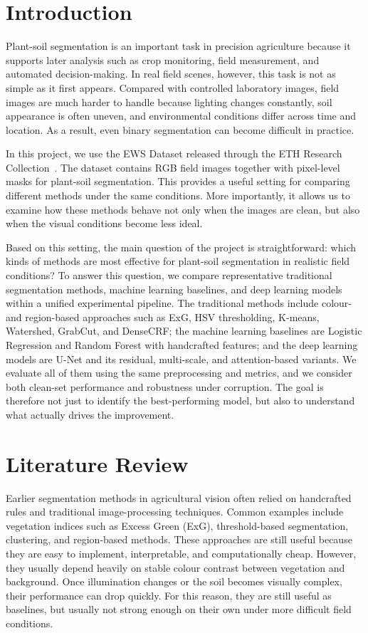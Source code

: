 \documentclass[conference]{IEEEtran}
\begin{document}
\section{Introduction}

Plant-soil segmentation is an important task in precision agriculture
because it supports later analysis such as crop monitoring, field
measurement, and automated decision-making. In real field scenes,
however, this task is not as simple as it first appears. Compared with
controlled laboratory images, field images are much harder to handle
because lighting changes constantly, soil appearance is often uneven,
and environmental conditions differ across time and location. As a
result, even binary segmentation can become difficult in practice.

In this project, we use the EWS Dataset released through the ETH
Research Collection~\cite{ews}. The dataset contains RGB field images
together with pixel-level masks for plant-soil segmentation. This
provides a useful setting for comparing different methods under the same
conditions. More importantly, it allows us to examine how these methods
behave not only when the images are clean, but also when the visual
conditions become less ideal.

Based on this setting, the main question of the project is
straightforward: which kinds of methods are most effective for
plant-soil segmentation in realistic field conditions? To answer this
question, we compare representative traditional segmentation methods,
machine learning baselines, and deep learning models within a unified
experimental pipeline. The traditional methods include colour- and
region-based approaches such as ExG, HSV thresholding, K-means,
Watershed, GrabCut, and DenseCRF\@; the machine learning baselines are
Logistic Regression and Random Forest with handcrafted features; and the
deep learning models are U-Net and its residual, multi-scale, and
attention-based variants. We evaluate all of them using the same
preprocessing and metrics, and we consider both clean-set performance
and robustness under corruption. The goal is therefore not just to
identify the best-performing model, but also to understand what actually
drives the improvement.

\section{Literature Review}

Earlier segmentation methods in agricultural vision often relied on
handcrafted rules and traditional image-processing techniques. Common
examples include vegetation indices such as Excess Green (ExG),
threshold-based segmentation, clustering, and region-based methods.
These approaches are still useful because they are easy to implement,
interpretable, and computationally cheap. However, they usually depend
heavily on stable colour contrast between vegetation and background.
Once illumination changes or the soil becomes visually complex, their
performance can drop quickly. For this reason, they are still useful as
baselines, but usually not strong enough on their own under more
difficult field conditions.
\end{document}
